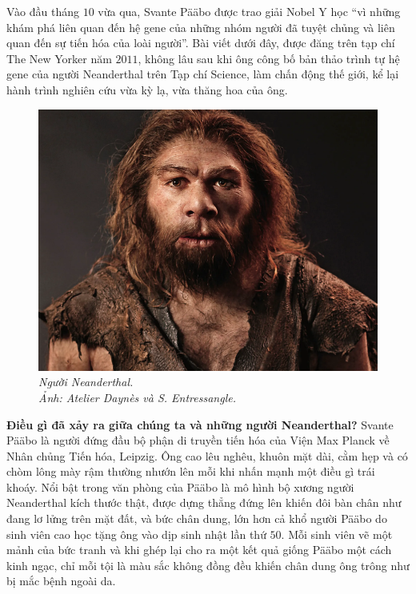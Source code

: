 \begin{multicols}{2}
	Vào đầu tháng $10$ vừa qua, Svante Pääbo được trao giải Nobel Y học “vì những khám phá liên quan đến hệ gene của những nhóm người đã tuyệt chủng và liên quan đến sự tiến hóa của loài người”. Bài viết dưới đây, được đăng trên tạp chí The New Yorker năm $2011$, không lâu sau khi ông công bố bản thảo trình tự hệ gene của người Neanderthal trên Tạp chí Science, làm chấn động thế giới, kể lại hành trình nghiên cứu vừa kỳ lạ, vừa thăng hoa của ông.  
	\begin{figure}[H]
		\vspace*{-5pt}
		\centering
		\captionsetup{labelformat= empty, justification=centering}
		\includegraphics[width= 1\linewidth]{1}
		\caption{\small\textit{\color{timhieukhoahoc}Người Neanderthal. \\Ảnh: Atelier Daynès và S. Entressangle.}}
		\vspace*{-10pt}
	\end{figure}
	\textbf{\color{timhieukhoahoc}Điều gì đã xảy ra giữa chúng ta và những người Neanderthal?}
	\vskip 0.1cm
	Svante Pääbo là người đứng đầu bộ phận di truyền tiến hóa của Viện Max Planck về Nhân chủng Tiến hóa, Leipzig. Ông cao lêu nghêu, khuôn mặt dài, cằm hẹp và có chòm lông mày rậm thường nhướn lên mỗi khi nhấn mạnh một điều gì trái khoáy. Nổi bật trong văn phòng của Pääbo là mô hình bộ xương người Neanderthal kích thước thật, được dựng thẳng đứng lên khiến đôi bàn chân như đang lơ lửng trên mặt đất, và bức chân dung, lớn hơn cả khổ người Pääbo do sinh viên cao học tặng ông vào dịp sinh nhật lần thứ $50$. Mỗi sinh viên vẽ một mảnh của bức tranh và khi ghép lại cho ra một kết quả giống Pääbo một cách kinh ngạc, chỉ mỗi tội là màu sắc không đồng đều khiến chân dung ông trông như bị mắc bệnh ngoài da.

\end{multicols}

